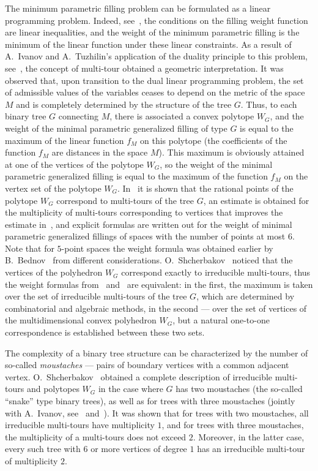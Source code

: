 \documentclass[10pt]{article}
\theoremstyle{plain}
\theoremstyle{definition}
\begin{document}
The minimum parametric filling problem can be formulated as a linear programming problem. Indeed, see~\cite{IT_MSb}, the conditions on the filling weight function are linear inequalities, and the weight of the minimum parametric filling is the minimum of the linear function under these linear constraints. As a result of A.~Ivanov and A.~Tuzhilin's application of the duality principle to this problem, see~\cite{IT_LP}, the concept of multi-tour obtained a geometric interpretation. It was observed that, upon transition to the dual linear programming problem, the set of admissible values of the variables ceases  to depend on the metric of the space $M$ and is completely determined by the structure of the tree $G$. Thus, to each binary tree $G$ connecting $M$, there is associated a convex polytope $W_G$, and the weight of the minimal parametric generalized filling of type $G$ is equal to the maximum of the linear function $f_M$ on this polytope (the coefficients of the function $f_M$ are distances in the space $M$). This maximum is obviously attained at one of the vertices of the polytope $W_G$, so the weight of the minimal parametric generalized filling is equal to the maximum of the function $f_M$ on the vertex set of the polytope $W_G$. In~\cite{IT_LP} it is shown that the rational points of the polytope $W_G$ correspond to multi-tours of the tree $G$, an estimate is obtained for the multiplicity of multi-tours corresponding to vertices that improves the estimate in~\cite{Eremin}, and explicit formulas are written out for the weight of minimal parametric generalized fillings of spaces with the number of points at most $6$. Note that for $5$-point spaces the weight formula was obtained earlier by B.~Bednov~\cite{BBed} from different considerations. O.~Shcherbakov~\cite{Shch1} noticed that the vertices of the polyhedron $W_G$ correspond exactly to irreducible multi-tours, thus the weight formulas from~\cite{Eremin} and~\cite{IT_LP} are equivalent: in the first, the maximum is taken over the set of irreducible multi-tours of the tree $G$, which are determined by combinatorial and algebraic methods, in the second --- over the set of vertices of the multidimensional convex polyhedron $W_G$, but a natural one-to-one correspondence is established between these two sets.

The complexity of a binary tree structure can be characterized by the number of so-called \emph{moustaches\/} --- pairs of boundary vertices with a common adjacent vertex. O.~Shcherbakov~\cite{Shch1} obtained a complete description of irreducible multi-tours and polytopes $W_G$ in the case where $G$ has two moustaches (the so-called ``snake'' type binary trees), as well as for trees with three moustaches (jointly with A.~Ivanov, see~\cite{IvShch} and~\cite{Shch2}). It was shown that for trees with two moustaches, all irreducible multi-tours have multiplicity $1$, and for trees with three moustaches, the multiplicity of a multi-tours does not exceed $2$. Moreover, in the latter case, every such tree with $6$ or more vertices of degree $1$ has an irreducible multi-tour of multiplicity $2$.
\end{document}

